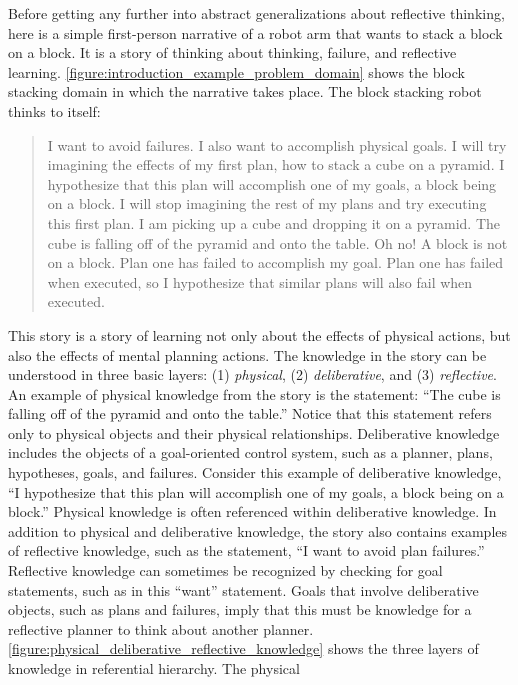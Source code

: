 Before getting any further into abstract generalizations about
reflective thinking, here is a simple first-person narrative of a
robot arm that wants to stack a block on a block.  It is a story of
thinking about thinking, failure, and reflective learning.
{\autoref{figure:introduction_example_problem_domain}} shows the block
stacking domain in which the narrative takes place.  The block
stacking robot thinks to itself:
\begin{quote}
  I want to avoid failures.  I also want to accomplish physical goals.
  I will try imagining the effects of my first plan, how to stack a
  cube on a pyramid.  I hypothesize that this plan will accomplish one
  of my goals, a block being on a block.  I will stop imagining the
  rest of my plans and try executing this first plan.  I am picking up
  a cube and dropping it on a pyramid.  The cube is falling off of the
  pyramid and onto the table.  Oh no!  A block is not on a block.
  Plan one has failed to accomplish my goal.  Plan one has failed when
  executed, so I hypothesize that similar plans will also fail when
  executed.
\end{quote}
This story is a story of learning not only about the effects of
physical actions, but also the effects of mental planning actions.
The knowledge in the story can be understood in three basic layers:
(1) {\emph{physical}}, (2) {\emph{deliberative}}, and (3)
{\emph{reflective}}.  An example of physical knowledge from the story
is the statement: ``The cube is falling off of the pyramid and onto
the table.''  Notice that this statement refers only to physical
objects and their physical relationships.  Deliberative knowledge
includes the objects of a goal-oriented control system, such as a
planner, plans, hypotheses, goals, and failures.  Consider this
example of deliberative knowledge, ``I hypothesize that this plan will
accomplish one of my goals, a block being on a block.''  Physical
knowledge is often referenced within deliberative knowledge.  In
addition to physical and deliberative knowledge, the story also
contains examples of reflective knowledge, such as the statement, ``I
want to avoid plan failures.''  Reflective knowledge can sometimes be
recognized by checking for goal statements, such as in this ``want''
statement.  Goals that involve deliberative objects, such as plans and
failures, imply that this must be knowledge for a reflective planner
to think about another planner.
{\autoref{figure:physical_deliberative_reflective_knowledge}} shows
the three layers of knowledge in referential hierarchy.  The physical

